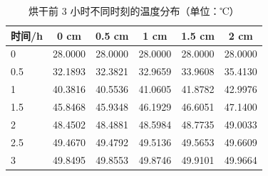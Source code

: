 \begin{table}[htbp]
\centering
\caption{烘干前 3 小时不同时刻的温度分布（单位：℃）}
\label{tab:t3}
\begin{tabular}{lccccc}
\toprule
时间/h & 0 cm & 0.5 cm & 1 cm & 1.5 cm & 2 cm \\
\midrule
0 & 28.0000 & 28.0000 & 28.0000 & 28.0000 & 28.0000 \\
0.5 & 32.1893 & 32.3821 & 32.9659 & 33.9608 & 35.4130 \\
1 & 40.3816 & 40.5536 & 41.0605 & 41.8782 & 42.9976 \\
1.5 & 45.8468 & 45.9348 & 46.1929 & 46.6051 & 47.1400 \\
2 & 48.4502 & 48.4881 & 48.5984 & 48.7735 & 49.0033 \\
2.5 & 49.4670 & 49.4792 & 49.5136 & 49.5653 & 49.6609 \\
3 & 49.8495 & 49.8553 & 49.8746 & 49.9101 & 49.9664 \\
\bottomrule
\end{tabular}
\end{table}
